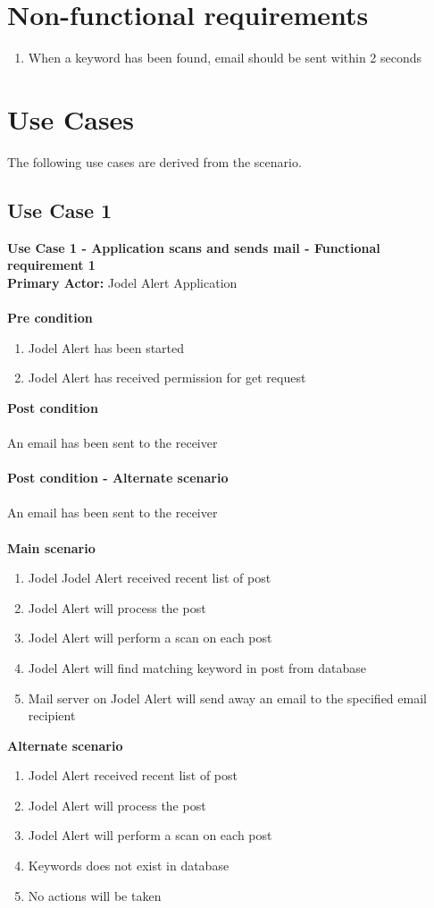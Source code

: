 \documentclass[a4paper,12pt]{article}
\begin{document}
\section{Non-functional requirements}
\begin{enumerate}
	\item When a keyword has been found, email should be sent within 2 seconds
\end{enumerate}
\clearpage
\section{Use Cases}
The following use cases are derived from the scenario.
\subsection{Use Case 1}
\textbf{Use Case 1 - Application scans and sends mail - Functional requirement 1}\\
\textbf{Primary Actor:}
Jodel Alert Application\\\\
\textbf{Pre condition}
\begin{enumerate}
	\item Jodel Alert has been started
	\item Jodel Alert has received permission for get request
\end{enumerate}
\textbf{Post condition}\\\\
An email has been sent to the receiver\\\\
\textbf{Post condition - Alternate scenario}\\\\
An email has been sent to the receiver\\\\
\textbf{Main scenario}
\begin{enumerate}
	\item Jodel Jodel Alert received recent list of post
	\item Jodel Alert will process the post
	\item Jodel Alert will perform a scan on each post
	\item Jodel Alert will find matching keyword in post from database 
	\item Mail server on Jodel Alert will send away an email to the specified email recipient
\end{enumerate}
\textbf{Alternate scenario}
\begin{enumerate}
	\item Jodel Alert received recent list of post
	\item Jodel Alert will process the post
	\item Jodel Alert will perform a scan on each post
	\item Keywords does not exist in database
	\item No actions will be taken
\end{enumerate}
\end{document}

